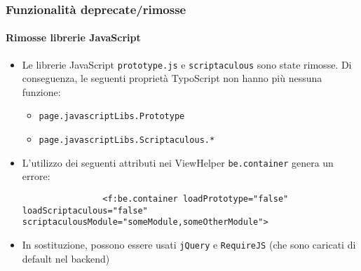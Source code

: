 \begin{frame}[fragile]
	\frametitle{Funzionalità deprecate/rimosse}
	\framesubtitle{Rimosse librerie JavaScript}

	\begin{itemize}

		\item Le librerie JavaScript \texttt{prototype.js} e \texttt{scriptaculous} sono state rimosse.
			Di conseguenza, le seguenti proprietà TypoScript non hanno più nessuna funzione:

			\begin{itemize}
				\item \texttt{page.javascriptLibs.Prototype}
				\item \texttt{page.javascriptLibs.Scriptaculous.*}
			\end{itemize}

		\item L'utilizzo dei seguenti attributi nei ViewHelper \texttt{be.container} genera un errore:
			\begin{lstlisting}
				<f:be.container loadPrototype="false" loadScriptaculous="false" scriptaculousModule="someModule,someOtherModule">
			\end{lstlisting}

		\item In sostituzione, possono essere usati \texttt{jQuery} e \texttt{RequireJS}\newline
			(che sono caricati di default nel backend)

	\end{itemize}

\end{frame}


